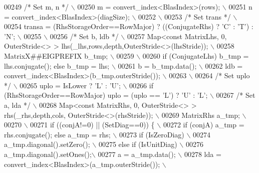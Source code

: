 \begin{DoxyCode}
00249 \textcolor{preprocessor}{}\textcolor{comment}{/* Set m, n */}\textcolor{preprocessor}{ \(\backslash\)}
00250 \textcolor{preprocessor}{   m = convert\_index<BlasIndex>(rows); \(\backslash\)}
00251 \textcolor{preprocessor}{   n = convert\_index<BlasIndex>(diagSize); \(\backslash\)}
00252 \textcolor{preprocessor}{\(\backslash\)}
00253 \textcolor{preprocessor}{}\textcolor{comment}{/* Set trans */}\textcolor{preprocessor}{ \(\backslash\)}
00254 \textcolor{preprocessor}{   transa = (RhsStorageOrder==RowMajor) ? ((ConjugateRhs) ? 'C' : 'T') : 'N'; \(\backslash\)}
00255 \textcolor{preprocessor}{\(\backslash\)}
00256 \textcolor{preprocessor}{}\textcolor{comment}{/* Set b, ldb */}\textcolor{preprocessor}{ \(\backslash\)}
00257 \textcolor{preprocessor}{   Map<const MatrixLhs, 0, OuterStride<> > lhs(\_lhs,rows,depth,OuterStride<>(lhsStride)); \(\backslash\)}
00258 \textcolor{preprocessor}{   MatrixX##EIGPREFIX b\_tmp; \(\backslash\)}
00259 \textcolor{preprocessor}{\(\backslash\)}
00260 \textcolor{preprocessor}{   if (ConjugateLhs) b\_tmp = lhs.conjugate(); else b\_tmp = lhs; \(\backslash\)}
00261 \textcolor{preprocessor}{   b = b\_tmp.data(); \(\backslash\)}
00262 \textcolor{preprocessor}{   ldb = convert\_index<BlasIndex>(b\_tmp.outerStride()); \(\backslash\)}
00263 \textcolor{preprocessor}{\(\backslash\)}
00264 \textcolor{preprocessor}{}\textcolor{comment}{/* Set uplo */}\textcolor{preprocessor}{ \(\backslash\)}
00265 \textcolor{preprocessor}{   uplo = IsLower ? 'L' : 'U'; \(\backslash\)}
00266 \textcolor{preprocessor}{   if (RhsStorageOrder==RowMajor) uplo = (uplo == 'L') ? 'U' : 'L'; \(\backslash\)}
00267 \textcolor{preprocessor}{}\textcolor{comment}{/* Set a, lda */}\textcolor{preprocessor}{ \(\backslash\)}
00268 \textcolor{preprocessor}{   Map<const MatrixRhs, 0, OuterStride<> > rhs(\_rhs,depth,cols, OuterStride<>(rhsStride)); \(\backslash\)}
00269 \textcolor{preprocessor}{   MatrixRhs a\_tmp; \(\backslash\)}
00270 \textcolor{preprocessor}{\(\backslash\)}
00271 \textcolor{preprocessor}{   if ((conjA!=0) || (SetDiag==0)) \{ \(\backslash\)}
00272 \textcolor{preprocessor}{     if (conjA) a\_tmp = rhs.conjugate(); else a\_tmp = rhs; \(\backslash\)}
00273 \textcolor{preprocessor}{     if (IsZeroDiag) \(\backslash\)}
00274 \textcolor{preprocessor}{       a\_tmp.diagonal().setZero(); \(\backslash\)}
00275 \textcolor{preprocessor}{     else if (IsUnitDiag) \(\backslash\)}
00276 \textcolor{preprocessor}{       a\_tmp.diagonal().setOnes();\(\backslash\)}
00277 \textcolor{preprocessor}{     a = a\_tmp.data(); \(\backslash\)}
00278 \textcolor{preprocessor}{     lda = convert\_index<BlasIndex>(a\_tmp.outerStride()); \(\backslash\)}

\end{DoxyCode}
